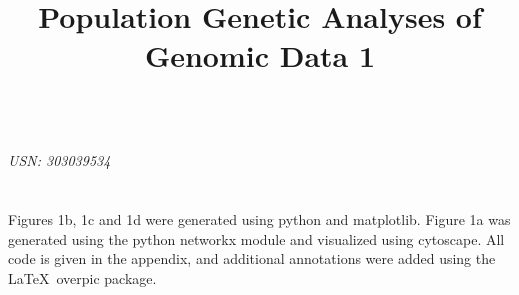 \documentclass{article}
\title{Population Genetic Analyses of Genomic Data 1}
\begin{document}

\begin{center}
\textbf{\Large{}}\\
\textit{USN: 303039534}
\end{center}

\section{}

Figures 1b, 1c and 1d  were generated using python and matplotlib. Figure 1a was generated using the python networkx module and visualized using cytoscape. All code is given in the appendix, and additional annotations were added using the \LaTeX \, overpic package.\\\\
\end{document}
